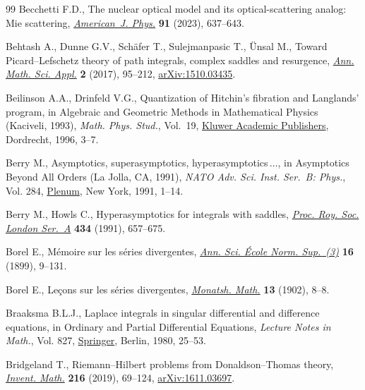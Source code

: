\documentclass[10pt,a4paper]{amsart}
\numberwithin{equation}{section}
\begin{document}
\begin{thebibliography}{99}
Becchetti F.D., The nuclear optical model and its optical-scattering analog:
 {M}ie scattering,
 \href{https://doi.org/10.1119/5.0152813}{\textit{American~J. Phys.}}
 \textbf{91} (2023), 637--643.

Behtash A., Dunne G.V., Sch\"afer T., Sulejmanpasic T., \"Unsal M., Toward
 {P}icard--{L}efschetz theory of path integrals, complex saddles and
 resurgence, \href{https://doi.org/10.4310/AMSA.2017.v2.n1.a3}{\textit{Ann.
 Math. Sci. Appl.}} \textbf{2} (2017), 95--212,
 \href{http://arxiv.org/abs/1510.03435}{arXiv:1510.03435}.

Beilinson A.A., Drinfeld V.G., Quantization of {H}itchin's fibration and
 {L}anglands' program, in Algebraic and {G}eometric {M}ethods in
 {M}athematical {P}hysics ({K}aciveli, 1993), \textit{Math. Phys. Stud.},
 Vol.~19, \href{https://doi.org/10.1007/978-94-017-0693-3_1}{Kluwer Academic
 Publishers}, Dordrecht, 1996, 3--7.

Berry M., Asymptotics, superasymptotics, hyperasymptotics{$\,\dots$}, in
 Asymptotics {B}eyond {A}ll {O}rders ({L}a {J}olla, {CA}, 1991), \textit{NATO
 Adv. Sci. Inst. Ser.~B: Phys.}, Vol. 284,
 \href{https://doi.org/10.1007/978-1-4757-0435-8_1}{Plenum}, New York, 1991,
 1--14.

Berry M., Howls C., Hyperasymptotics for integrals with saddles,
 \href{https://doi.org/10.1098/rspa.1991.0119}{\textit{Proc. Roy. Soc. London
 Ser.~A}} \textbf{434} (1991), 657--675.

Borel E., M\'emoire sur les s\'eries divergentes,
 \href{https://doi.org/10.24033/asens.463}{\textit{Ann. Sci. \'Ecole Norm.
 Sup.~(3)}} \textbf{16} (1899), 9--131.

Borel E., Le\c{c}ons sur les s\'eries divergentes,
 \href{https://doi.org/10.1007/BF01703288}{\textit{Monatsh. Math.}}
 \textbf{13} (1902), 8--8.

Braaksma B.L.J., Laplace integrals in singular differential and difference
 equations, in Ordinary and {P}artial {D}ifferential {E}quations,
 \textit{Lecture Notes in Math.}, Vol. 827,
 \href{https://doi.org/10.1007/BFb0091373}{Springer}, Berlin, 1980, 25--53.

Bridgeland T., Riemann--{H}ilbert problems from {D}onaldson--{T}homas theory,
 \href{https://doi.org/10.1007/s00222-018-0843-8}{\textit{Invent. Math.}}
 \textbf{216} (2019), 69--124,
 \href{http://arxiv.org/abs/1611.03697}{arXiv:1611.03697}.


\end{thebibliography}
\end{document}
